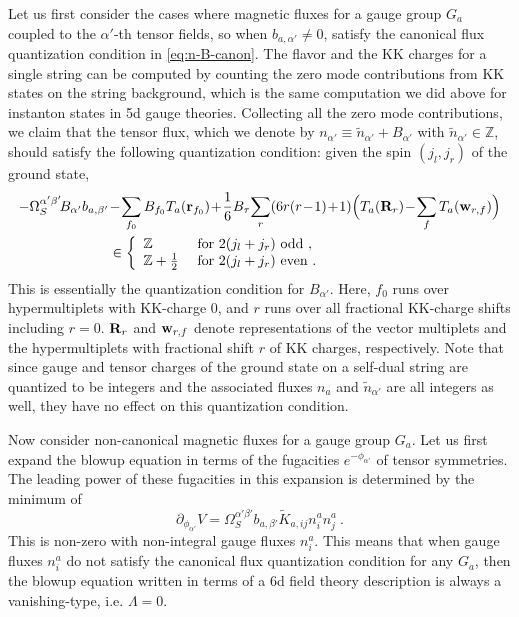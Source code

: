 Let us first consider the cases where magnetic fluxes for a gauge group $G_a$ coupled to the $\alpha'$-th tensor fields, so when $b_{a,\alpha'}\neq0$, satisfy the canonical flux quantization condition in \eqref{eq:n-B-canon}. The flavor and the KK charges for a single string can be computed by counting the zero mode contributions from KK states on the string background, which is the same computation we did above for instanton states in 5d gauge theories. Collecting all the zero mode contributions, we claim that the tensor flux, which we denote by $n_{\alpha'}\equiv \tilde{n}_{\alpha'}+B_{\alpha'}$ with $\tilde{n}_{\alpha'}\in \mathbb{Z}$, should satisfy the following quantization condition: given the spin $(j_l,j_r)$ of the ground state, 
\begin{align}
	-\Omega^{\alpha'\beta'}_S\!B_{\alpha'}b_{a,\beta'} &\!- \!\sum_{f_0}B_{f_0}T_a({\bf r}_{f_0}) \!+ \!\frac{1}6B_\tau\! \sum_{r}(6r(r\!-\!1)\!+\!1)\Big(T_a({\bf R}_r) \!-\! \sum_f T_a({\bf w}_{r,f})\Big) \nonumber \\
	&\in	\left\{\begin{array}{ll}
		\mathbb{Z}& ~\text{for~}2(j_l+j_r)~\text{odd}\ ,\\
		\mathbb{Z}+\frac12 & ~\text{for~}2(j_l+j_r)~\text{even}\ .
	\end{array} \right.
\end{align}
This is essentially the quantization condition for $B_{\alpha'}$.
Here, $f_0$ runs over hypermultiplets with KK-charge $0$, and $r$ runs over all fractional KK-charge shifts including $r=0$. ${\bf R}_r$ and ${\bf w}_{r,f}$ denote representations of the vector multiplets  and the hypermultiplets with fractional shift $r$ of KK charges, respectively. Note that since gauge and tensor charges of the ground state on a self-dual string are quantized to be integers and the associated fluxes $n_a$ and $\tilde{n}_{\alpha'}$ are all integers as well, they have no effect on this quantization condition.

Now consider non-canonical magnetic fluxes for a gauge group $G_a$. Let us first expand the blowup equation in terms of the fugacities $e^{-\phi_{\alpha'}}$ of tensor symmetries. The leading power of these fugacities in this expansion is determined by the minimum of
\begin{equation}
	\partial_{\phi_{\alpha'}}V=\Omega_S^{\alpha'\beta'}b_{a,\beta'}\tilde{K}_{a,ij}n^a_in^a_j  \ .
\end{equation}
This is non-zero with non-integral gauge fluxes $n^a_i$. This means that when gauge fluxes $n^a_i$ do not satisfy the canonical flux quantization condition for any $G_a$, then the blowup equation written in terms of a 6d field theory description is always a vanishing-type, i.e. $\Lambda=0$. 

